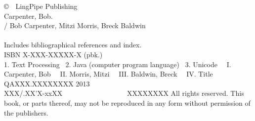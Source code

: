 \clearpage
\pagestyle{empty}
\vspace*{1.25in}
\noindent
{\footnotesize%
\copyright \ \ LingPipe Publishing
\hfill
\vfill
\vfill
{}
\\[6pt]
Carpenter, Bob.
\\
\hspace*{0.125in}{\it Text Processing with Java} / Bob
Carpenter, Mitzi Morris, Breck Baldwin
\\
\hspace*{.5in}{p. cm.}
\\
\hspace*{0.125in}Includes bibliographical references and index.
\\
\hspace*{0.125in}ISBN X-XXX-XXXXX-X (pbk.)
\\[4pt]
1. Text Processing  \ 2. Java (computer program language) \ 3. Unicode
\ \ I. Carpenter, Bob \ \ II. Morris, Mitzi \ \ III. Baldwin, Breck \ \ IV. Title
\\[2pt]
\hspace*{0.125in}QAXXX.XXXXXXXX 2013
\\[2pt]
\hspace*{0.125in}XXX/.XX'X-xxXX      \ \ \ \ \ \ \ \ \ \ \ \ \ \ \ \ \  \ XXXXXXXX
\vfill
All rights reserved. This book, or parts thereof, may not
be reproduced in any form without permission of the publishers.
}

